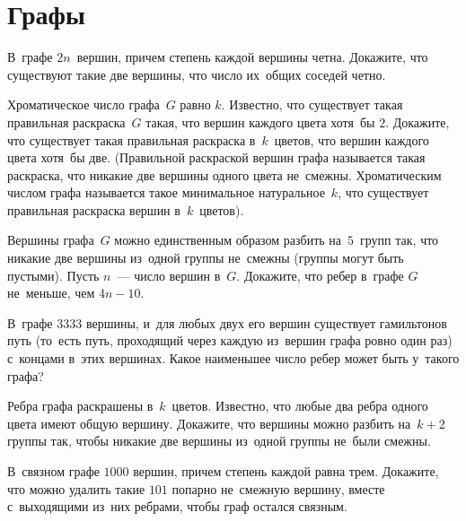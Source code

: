 
\section*{Графы}


\begin{problems}

\item
В~графе $2 n$~вершин, причем степень каждой вершины четна.
Докажите, что существуют такие две вершины, что число их~общих соседей четно.

\item
Хроматическое число графа~$G$ равно $k$.
Известно, что существует такая правильная раскраска~$G$ такая, что вершин
каждого цвета хотя~бы $2$.
Докажите, что существует такая правильная раскраска в~$k$~цветов, что вершин
каждого цвета хотя~бы две.
(Правильной раскраской вершин графа называется такая раскраска, что никакие две
вершины одного цвета не~смежны.
Хроматическим числом графа называется такое минимальное натуральное~$k$, что
существует правильная раскраска вершин в~$k$~цветов).

\item
Вершины графа~$G$ можно единственным образом разбить на~$5$~групп так, что
никакие две вершины из~одной группы не~смежны (группы могут быть пустыми).
Пусть $n$~— число вершин в~$G$.
Докажите, что ребер в~графе $G$ не~меньше, чем $4 n - 10$.

\item
В~графе $3333$ вершины, и~для любых двух его вершин существует гамильтонов путь
(то~есть путь, проходящий через каждую из~вершин графа ровно один раз)
с~концами в~этих вершинах.
Какое наименьшее число ребер может быть у~такого графа?

\item
Ребра графа раскрашены в~$k$~цветов.
Известно, что любые два ребра одного цвета имеют общую вершину.
Докажите, что вершины можно разбить на~$k + 2$ группы так, чтобы никакие две
вершины из~одной группы не~были смежны.

\item
В~связном графе $1000$ вершин, причем степень каждой равна трем.
Докажите, что можно удалить такие $101$ попарно не~смежную вершину, вместе
с~выходящими из~них ребрами, чтобы граф остался связным.


\end{problems}
